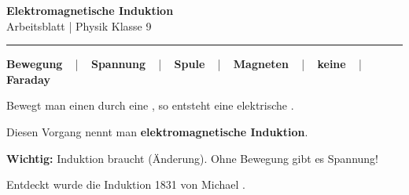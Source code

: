\documentclass[11pt, a4paper]{article}
\newcommand{\fach}{Physik}
\newcommand{\thema}{Elektromagnetische Induktion}
\newcommand{\klasse}{9}
\newcommand{\luecke}[1]{\underline{\hspace{#1}}}
\begin{document}

\begin{center}
    {\Large\bfseries\textcolor{fachfarbe}{\thema}}\\[0.15em]
    {\small Arbeitsblatt | \fach{} Klasse \klasse}
\end{center}
\vspace{-0.4em}
\hrule
\vspace{0.5em}


\begin{merkkasten}

\begin{wortbank}
\centering
\textbf{Bewegung} ~ | ~ \textbf{Spannung} ~ | ~ \textbf{Spule} ~ | ~ \textbf{Magneten} ~ | ~ \textbf{keine} ~ | ~ \textbf{Faraday}
\end{wortbank}

\vspace{2mm}

Bewegt man einen \luecke{2.5cm} durch eine \luecke{2.5cm}, so entsteht eine elektrische \luecke{2.5cm}.

\vspace{2mm}

Diesen Vorgang nennt man \textbf{elektromagnetische Induktion}.

\vspace{2mm}

\textbf{Wichtig:} Induktion braucht \luecke{2.5cm} (Änderung). Ohne Bewegung gibt es \luecke{2.5cm} Spannung!

\vspace{2mm}

Entdeckt wurde die Induktion 1831 von Michael \luecke{2.5cm}.

\end{merkkasten}

\end{document}
